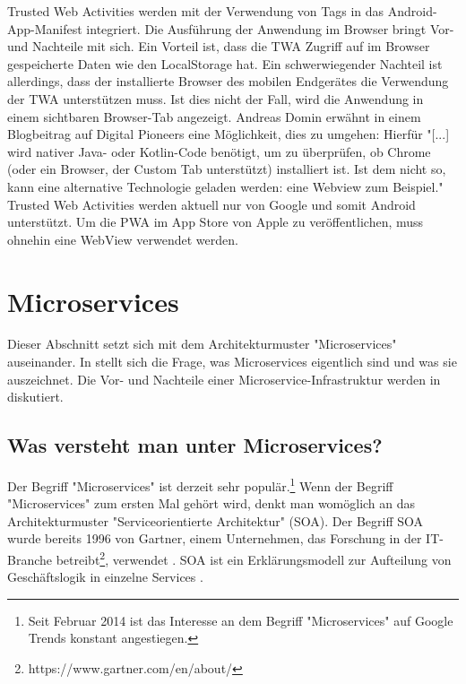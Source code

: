 Trusted Web Activities werden mit der Verwendung von  Tags in das Android-App-Manifest integriert. Die
Ausführung der Anwendung im Browser bringt Vor- und Nachteile mit sich.
Ein Vorteil ist, dass die TWA Zugriff auf im Browser gespeicherte Daten wie den LocalStorage
hat. Ein schwerwiegender Nachteil ist allerdings, dass der installierte Browser des mobilen Endgerätes
die Verwendung der TWA unterstützen muss. Ist dies nicht der Fall, wird die Anwendung in einem sichtbaren
Browser-Tab angezeigt. Andreas Domin erwähnt in einem Blogbeitrag auf Digital Pioneers eine Möglichkeit,
dies zu umgehen: Hierfür "[...] wird nativer Java- oder Kotlin-Code benötigt, um zu überprüfen, ob Chrome
(oder ein Browser, der Custom Tab unterstützt) installiert ist.
Ist dem nicht so, kann eine alternative Technologie geladen werden:
eine Webview zum Beispiel."\cite[2. Abschnitt]{TrustedWebActivitiesT3N}
Trusted Web Activities werden aktuell nur von Google und somit Android unterstützt. Um die PWA
im App Store von Apple zu veröffentlichen, muss ohnehin eine WebView verwendet werden.

\section{Microservices}
\label{sec:microservices}
Dieser Abschnitt setzt sich mit dem Architekturmuster "Microservices" auseinander.
In  stellt sich die Frage, was Microservices
eigentlich sind und was sie auszeichnet. Die Vor- und Nachteile einer Microservice-Infrastruktur
werden in  diskutiert.

\subsection{Was versteht man unter Microservices?}
\label{subsec:wasverstehtmanuntermicroservices}
Der Begriff "Microservices" ist derzeit sehr populär.\footnote{Seit Februar 2014 ist das Interesse
an dem Begriff "Microservices" auf Google Trends konstant angestiegen.\cite{MicroservicesGoogleTrends}}
Wenn der Begriff "Microservices" zum ersten Mal gehört wird, denkt man womöglich an das Architekturmuster
"Serviceorientierte Architektur" (SOA). Der Begriff SOA wurde bereits 1996
von Gartner, einem Unternehmen, das Forschung in der IT-Branche
betreibt\footnote{https://www.gartner.com/en/about/}, verwendet \cite{GartnerSOAPart1}.
SOA ist ein Erklärungsmodell zur Aufteilung von Geschäftslogik in einzelne Services \cite{SOAManifesto}.

